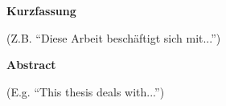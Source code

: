 %
%
% 
% 
% 



\cleardoublepage

\begin{center}
{\Large\bfseries Kurzfassung}
\end{center}


(Z.B. ``Diese Arbeit beschäftigt sich mit...'')



\cleardoublepage


\begin{center}
{\Large\bfseries Abstract}
\end{center}

(E.g. ``This thesis deals with...'')

